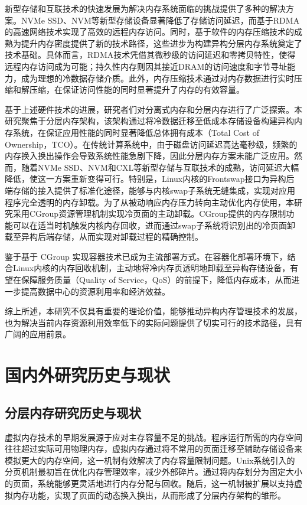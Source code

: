 新型存储和互联技术的快速发展为解决内存系统面临的挑战提供了多种的解决方案。NVMe SSD、NVM等新型存储设备显著降低了存储访问延迟，而基于RDMA的高速网络技术实现了高效的远程内存访问。同时，基于软件的内存压缩技术的成熟为提升内存密度提供了新的技术路径，这些进步为构建异构分层内存系统奠定了技术基础。具体而言，RDMA技术凭借其微秒级的访问延迟和零拷贝特性，使得远程内存访问成为可能；持久性内存则因其接近DRAM的访问速度和字节寻址能力，成为理想的冷数据存储介质。此外，内存压缩技术通过对内存数据进行实时压缩和解压缩，在保证访问性能的同时显著提升了内存的有效容量。

基于上述硬件技术的进展，研究者们对分离式内存和分层内存进行了广泛探索。本研究聚焦于分层内存架构，该架构通过将冷数据迁移至低成本存储设备构建异构内存系统，在保证应用性能的同时显著降低总体拥有成本（Total Cost of Ownership，TCO）。在传统计算系统中，由于磁盘访问延迟高达毫秒级，频繁的内存换入换出操作会导致系统性能急剧下降，因此分层内存方案未能广泛应用。然而，随着NVMe SSD、NVM和CXL等新型存储与互联技术的成熟，访问延迟大幅降低，使这一方案重新变得可行。特别是，Linux内核的Frontswap接口为异构后端存储的接入提供了标准化途径，能够与内核swap子系统无缝集成，实现对应用程序完全透明的内存卸载。为了从被动响应内存压力转向主动优化内存使用，本研究采用CGroup资源管理机制实现冷页面的主动卸载。CGroup提供的内存限制功能可以在适当时机触发内核内存回收，进而通过swap子系统将识别出的冷页面卸载至异构后端存储，从而实现对卸载过程的精确控制。

鉴于基于 CGroup 实现容器技术已成为主流部署方式。在容器化部署环境下，结合Linux内核的内存回收机制，主动地将冷内存页透明地卸载至异构存储设备，有望在保障服务质量（Quality of Service，QoS）的前提下，降低内存成本，从而进一步提高数据中心的资源利用率和经济效益。

综上所述，本研究不仅具有重要的理论价值，能够推动异构内存管理技术的发展，也为解决当前内存资源利用效率低下的实际问题提供了切实可行的技术路径，具有广阔的应用前景。

\section{国内外研究历史与现状}

\subsection{分层内存研究历史与现状}

虚拟内存技术的早期发展源于应对主存容量不足的挑战。程序运行所需的内存空间往往超过实际可用物理内存，虚拟内存通过将不常用的页面迁移至辅助存储设备来模拟更大的内存空间，这一机制有效解决了内存容量限制问题。Unix系统引入的分页机制最初旨在优化内存管理效率，减少外部碎片。通过将内存划分为固定大小的页面，系统能够更灵活地进行内存分配与回收。随后，这一机制被扩展以支持虚拟内存功能，实现了页面的动态换入换出，从而形成了分层内存架构的雏形。


